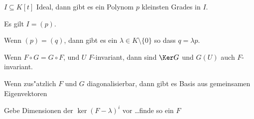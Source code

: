 \documentclass[a4,11pt]{article}
\begin{document}
\vspace*{-17mm}
{
\kopf
}


\begin{aufgabe}[4 Punkte]
$I \subseteq K[t]$ Ideal, dann gibt es ein Polynom $p$ kleinsten
Grades in $I$.

Es gilt $I = (p)$.

Wenn $(p) = (q)$, dann gibt es ein $\lambda \in K \setminus \{0\}$ so
dass $q = \lambda p$.

\end{aufgabe}

\begin{aufgabe}[4 Punkte]
Wenn $F \circ G = G \circ F$, und $U$ $F$-invariant, dann sind $\Ker G$
und $G(U)$ auch $F$-invariant.

Wenn zus"atzlich $F$ und $G$ diagonalisierbar, dann gibt es Basis aus
gemeinsamen Eigenvektoren
\end{aufgabe}


\begin{aufgabe}[4 Punkte]
Gebe Dimensionen der $\ker (F -\lambda)^i$ vor \ldots finde so ein $F$  
\end{aufgabe}
\end{document}
